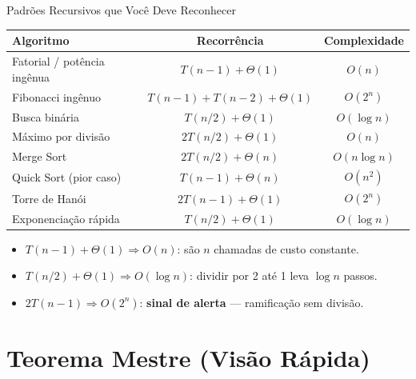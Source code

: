 \documentclass[aspectratio=169]{beamer}
\begin{document}
\begin{frame}[shrink]{Padrões Recursivos que Você Deve Reconhecer}
  \begin{center}
  \renewcommand{\arraystretch}{1.25}
  \small
  \begin{tabular}{lcc}
    \toprule
    \textbf{Algoritmo} & \textbf{Recorrência} & \textbf{Complexidade} \\
    \midrule
    Fatorial / potência ingênua & $T(n{-}1) + \Theta(1)$            & $O(n)$ \\
    Fibonacci ingênuo           & $T(n{-}1) + T(n{-}2) + \Theta(1)$ & $O(2^n)$ \\
    Busca binária               & $T(n/2) + \Theta(1)$              & $O(\log n)$ \\
    Máximo por divisão          & $2T(n/2) + \Theta(1)$             & $O(n)$ \\
    Merge Sort                  & $2T(n/2) + \Theta(n)$             & $O(n \log n)$ \\
    Quick Sort (pior caso)      & $T(n{-}1) + \Theta(n)$            & $O(n^2)$ \\
    Torre de Hanói              & $2T(n{-}1) + \Theta(1)$           & $O(2^n)$ \\
    Exponenciação rápida        & $T(n/2) + \Theta(1)$              & $O(\log n)$ \\
    \bottomrule
  \end{tabular}
  \end{center}

  \vspace{0.2cm}
  \begin{itemize}
    \item $T(n{-}1) + \Theta(1) \Rightarrow O(n)$: são $n$ chamadas de custo constante.
    \item $T(n/2) + \Theta(1) \Rightarrow O(\log n)$: dividir por 2 até 1 leva $\log n$ passos.
    \item $2T(n{-}1) \Rightarrow O(2^n)$: \textbf{sinal de alerta} --- ramificação sem divisão.
  \end{itemize}
\end{frame}

\section{Teorema Mestre (Visão Rápida)}
\end{document}
